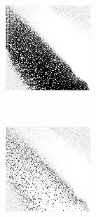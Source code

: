 
\begin{figure}
\center

	\begin{subfigure}[t]{0.22\textwidth}
		\includegraphics[width=\textwidth]{images/findings/experiments/punishment/strategies_handmaxmin.png}
		\caption{\handmaxmin}
	\end{subfigure}
	~
	\begin{subfigure}[t]{0.22\textwidth}
		\includegraphics[width=\textwidth]{images/findings/experiments/punishment/strategies_handmaxavg.png}

\end{subfigure}
\end{figure}
